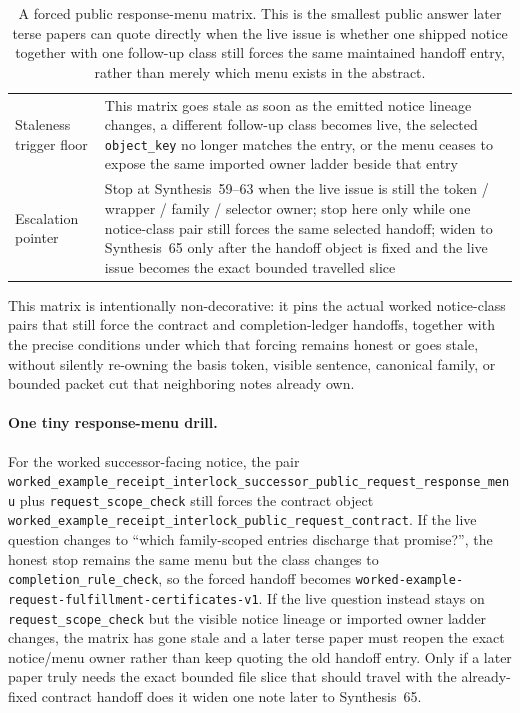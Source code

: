 \documentclass[11pt]{article}
\begin{document}
\begin{table}[t]
\begin{tabularx}{\linewidth}{@{}lX@{}}
Staleness trigger floor & This matrix goes stale as soon as the emitted notice lineage changes, a different follow-up class becomes live, the selected \nolinkurl{object_key} no longer matches the entry, or the menu ceases to expose the same imported owner ladder beside that entry \\
Escalation pointer & Stop at Synthesis~59--63 when the live issue is still the token / wrapper / family / selector owner; stop here only while one notice-class pair still forces the same selected handoff; widen to Synthesis~65 only after the handoff object is fixed and the live issue becomes the exact bounded travelled slice \\
\bottomrule
\end{tabularx}
\caption{A forced public response-menu matrix. This is the smallest public answer later terse papers can quote directly when the live issue is whether one shipped notice together with one follow-up class still forces the same maintained handoff entry, rather than merely which menu exists in the abstract.}
\label{tab:forced-public-response-menu-matrix}
\end{table}

This matrix is intentionally non-decorative: it pins the actual worked notice-class pairs that still force the contract and completion-ledger handoffs, together with the precise conditions under which that forcing remains honest or goes stale, without silently re-owning the basis token, visible sentence, canonical family, or bounded packet cut that neighboring notes already own.\cite{series:workedexample}

\paragraph{One tiny response-menu drill.}
For the worked successor-facing notice, the pair \nolinkurl{worked_example_receipt_interlock_successor_public_request_response_menu} plus \nolinkurl{request_scope_check} still forces the contract object \nolinkurl{worked_example_receipt_interlock_public_request_contract}. If the live question changes to ``which family-scoped entries discharge that promise?'', the honest stop remains the same menu but the class changes to \nolinkurl{completion_rule_check}, so the forced handoff becomes \nolinkurl{worked-example-request-fulfillment-certificates-v1}. If the live question instead stays on \nolinkurl{request_scope_check} but the visible notice lineage or imported owner ladder changes, the matrix has gone stale and a later terse paper must reopen the exact notice/menu owner rather than keep quoting the old handoff entry. Only if a later paper truly needs the exact bounded file slice that should travel with the already-fixed contract handoff does it widen one note later to Synthesis~65.\cite{series:workedexample}
\end{document}
